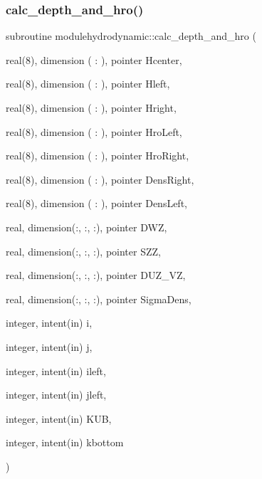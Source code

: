 \mbox{\label{namespacemodulehydrodynamic_a3795523d3d6ec72b6a33735c32624ff2}} 
\subsubsection{\texorpdfstring{calc\+\_\+depth\+\_\+and\+\_\+hro()}{calc\_depth\_and\_hro()}}
{\footnotesize\ttfamily subroutine modulehydrodynamic\+::calc\+\_\+depth\+\_\+and\+\_\+hro (\begin{DoxyParamCaption}\item[{real(8), dimension ( \+: ), pointer}]{Hcenter,  }\item[{real(8), dimension ( \+: ), pointer}]{Hleft,  }\item[{real(8), dimension ( \+: ), pointer}]{Hright,  }\item[{real(8), dimension ( \+: ), pointer}]{Hro\+Left,  }\item[{real(8), dimension ( \+: ), pointer}]{Hro\+Right,  }\item[{real(8), dimension ( \+: ), pointer}]{Dens\+Right,  }\item[{real(8), dimension ( \+: ), pointer}]{Dens\+Left,  }\item[{real, dimension(\+:, \+:, \+:), pointer}]{D\+WZ,  }\item[{real, dimension(\+:, \+:, \+:), pointer}]{S\+ZZ,  }\item[{real, dimension(\+:, \+:, \+:), pointer}]{D\+U\+Z\+\_\+\+VZ,  }\item[{real, dimension(\+:, \+:, \+:), pointer}]{Sigma\+Dens,  }\item[{integer, intent(in)}]{i,  }\item[{integer, intent(in)}]{j,  }\item[{integer, intent(in)}]{ileft,  }\item[{integer, intent(in)}]{jleft,  }\item[{integer, intent(in)}]{K\+UB,  }\item[{integer, intent(in)}]{kbottom }\end{DoxyParamCaption})\hspace{0.3cm}{\ttfamily [private]}}

